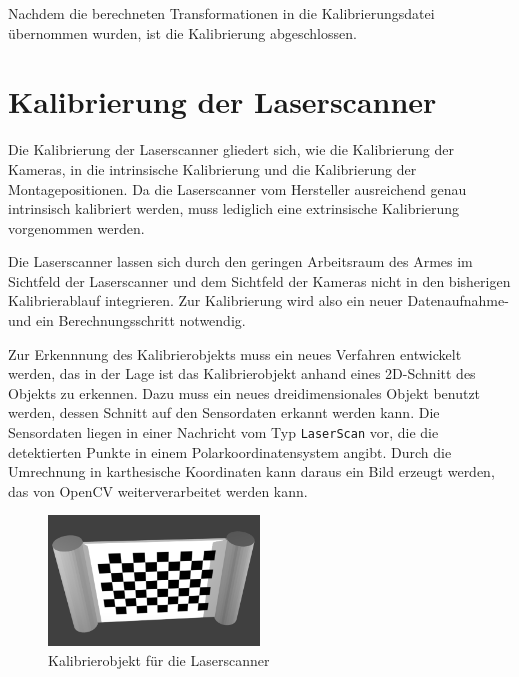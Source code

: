Nachdem die berechneten Transformationen in die Kalibrierungsdatei übernommen 
wurden, ist die Kalibrierung abgeschlossen.


\section{Kalibrierung der Laserscanner}
\label{sec:Kalibrierung der Laserscanner}

Die Kalibrierung der Laserscanner gliedert sich, wie die Kalibrierung der 
Kameras, in die intrinsische Kalibrierung und die Kalibrierung der Montagepositionen.
Da die Laserscanner vom Hersteller ausreichend genau intrinsisch kalibriert werden,
muss lediglich eine extrinsische Kalibrierung vorgenommen werden. 

Die Laserscanner lassen sich durch den geringen Arbeitsraum des Armes im Sichtfeld 
der Laserscanner und dem Sichtfeld der
Kameras nicht in den bisherigen Kalibrierablauf integrieren. Zur Kalibrierung 
wird also ein neuer Datenaufnahme- und ein Berechnungsschritt notwendig. 

Zur Erkennnung des Kalibrierobjekts muss ein neues Verfahren entwickelt werden,
das in der Lage ist das Kalibrierobjekt anhand eines 2D-Schnitt des Objekts zu erkennen. Dazu muss
ein neues dreidimensionales Objekt benutzt werden, dessen Schnitt auf den 
Sensordaten erkannt werden kann. 
Die Sensordaten liegen in einer Nachricht vom Typ \texttt{LaserScan} vor, die 
die detektierten Punkte in einem Polarkoordinatensystem angibt\cite{laserscan}. Durch die Umrechnung
in karthesische Koordinaten kann daraus ein Bild erzeugt werden, das von OpenCV
weiterverarbeitet werden kann.

\begin{figure}[htpb]
  \centering
  \includegraphics[width=0.5\textwidth]{images/laser_calibration_object}
  \caption{Kalibrierobjekt für die Laserscanner}
  \label{fig:kalibrierobjekt-laser}
\end{figure}

